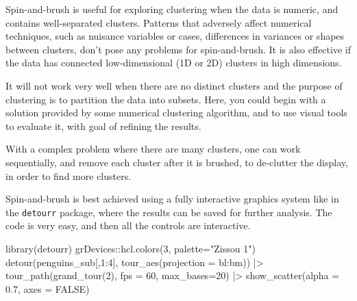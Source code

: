 \documentclass[
  letterpaper,
]{krantz}
\newenvironment{Shaded}{\begin{snugshade}}{\end{snugshade}}
\newcommand{\AttributeTok}[1]{\textcolor[rgb]{0.40,0.45,0.13}{#1}}
\newcommand{\ConstantTok}[1]{\textcolor[rgb]{0.56,0.35,0.01}{#1}}
\newcommand{\DecValTok}[1]{\textcolor[rgb]{0.68,0.00,0.00}{#1}}
\newcommand{\FloatTok}[1]{\textcolor[rgb]{0.68,0.00,0.00}{#1}}
\newcommand{\FunctionTok}[1]{\textcolor[rgb]{0.28,0.35,0.67}{#1}}
\newcommand{\NormalTok}[1]{\textcolor[rgb]{0.00,0.23,0.31}{#1}}
\newcommand{\SpecialCharTok}[1]{\textcolor[rgb]{0.37,0.37,0.37}{#1}}
\newcommand{\StringTok}[1]{\textcolor[rgb]{0.13,0.47,0.30}{#1}}
\begin{document}
Spin-and-brush is useful for exploring clustering when the data is
numeric, and contains well-separated clusters. Patterns that adversely
affect numerical techniques, such as nuisance variables or cases,
differences in variances or shapes between clusters, don't pose any
problems for spin-and-brush. It is also effective if the data has
connected low-dimensional (1D or 2D) clusters in high dimensions.

It will not work very well when there are no distinct clusters and the
purpose of clustering is to partition the data into subsets. Here, you
could begin with a solution provided by some numerical clustering
algorithm, and to use visual tools to evaluate it, with goal of refining
the results.

With a complex problem where there are many clusters, one can work
sequentially, and remove each cluster after it is brushed, to de-clutter
the display, in order to find more clusters.

Spin-and-brush is best achieved using a fully interactive graphics
system like in the \texttt{detourr} package, where the results can be
saved for further analysis. The code is very easy, and then all the
controls are interactive.

\begin{Shaded}
\begin{Highlighting}[]
\FunctionTok{library}\NormalTok{(detourr)}
\NormalTok{grDevices}\SpecialCharTok{::}\FunctionTok{hcl.colors}\NormalTok{(}\DecValTok{3}\NormalTok{, }\AttributeTok{palette=}\StringTok{"Zissou 1"}\NormalTok{)}
\FunctionTok{detour}\NormalTok{(penguins\_sub[,}\DecValTok{1}\SpecialCharTok{:}\DecValTok{4}\NormalTok{], }
       \FunctionTok{tour\_aes}\NormalTok{(}\AttributeTok{projection =}\NormalTok{ bl}\SpecialCharTok{:}\NormalTok{bm)) }\SpecialCharTok{|\textgreater{}}
       \FunctionTok{tour\_path}\NormalTok{(}\FunctionTok{grand\_tour}\NormalTok{(}\DecValTok{2}\NormalTok{), }\AttributeTok{fps =} \DecValTok{60}\NormalTok{, }
                 \AttributeTok{max\_bases=}\DecValTok{20}\NormalTok{) }\SpecialCharTok{|\textgreater{}}
       \FunctionTok{show\_scatter}\NormalTok{(}\AttributeTok{alpha =} \FloatTok{0.7}\NormalTok{, }
                    \AttributeTok{axes =} \ConstantTok{FALSE}\NormalTok{)}
\end{Highlighting}
\end{Shaded}
\end{document}
